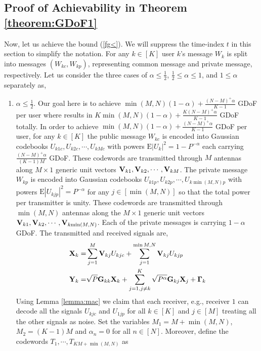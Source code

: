 \documentclass[11pt]{article}
\begin{document}
\subsection{Proof of Achievability in Theorem \ref{theorem:GDoF1}} \label{app3}
Now, let us achieve the bound (\ref{fg<}). We will suppress the time-index $t$ in this section to simplify the notation. For any $k\in[K]$ user $k$'s message $W_k$ is split into messages $(W_{kc},W_{kp})$, representing common message and private message, respectively.  Let us consider the three cases of $\alpha\le\frac{1}{2}$, $\frac{1}{2}\le\alpha\le1$, and $1\le\alpha$ separately as,
\begin{enumerate}
\item {$\alpha\le\frac{1}{2}$.} Our goal here is to achieve $\min(M,N)(1-\alpha)+\frac{(N-M)^+\alpha}{K-1}$ GDoF per user where results in $K\min(M,N)(1-\alpha)+\frac{K(N-M)^+\alpha}{K-1}$ GDoF totally. In order to achieve $\min(M,N)(1-\alpha)+\frac{(N-M)^+\alpha}{K-1}$ GDoF per user, for any $k\in[K]$ the public message $W_{kc}$ is encoded into Gaussian codebooks $U_{k1c},U_{k2c},\cdots,U_{kMc}$ with powers $\mbox{E}{|U_k|}^2=1-P^{-\alpha}$ each carrying $\frac{(N-M)^+\alpha}{(K-1)M}$ GDoF. These codewords are transmitted through $M$ antennas along  $M\times 1$ generic unit  vectors ${\bf V}_{k1},{\bf V}_{k2},\cdots,{\bf V}_{k{M}}$.  The private message $W_{kp}$ is encoded into Gaussian codebooks $U_{k1p},U_{k2p},\cdots,U_{k\min(M,N)p}$ with powers $\mbox{E}{|U_{kjp}|}^2=P^{-\alpha}$ for any $j\in[\min(M,N)]$ so that the total power per transmitter is unity. These codewords are transmitted through $\min(M,N)$ antennas along the $M\times 1$ generic unit  vectors ${\bf V}_{k1},{\bf V}_{k2},\cdots,{\bf V}_{k{\min(M,N)}}$. Each of the  private messages is carrying $1-\alpha$ GDoF. The transmitted and received signals are,
\begin{align}
\mathbf{X}_{k}=&\sum_{j=1}^{M}\mathbf{V}_{kj}{U}_{kjc}+\sum_{j=1}^{\min{M,N}}\mathbf{V}_{kj}{U}_{kjp}\label{TR21a-}\\
\mathbf{Y}_{k}=&\sqrt{P}{\bf G}_{kk}\mathbf{X}_{k}+\sum_{j=1,j\neq k}^{K}\sqrt{P^{\alpha}}{\bf {G}}_{kj}\mathbf{X}_{j}+\mathbf{\Gamma}_{k}\label{TR21a}
\end{align}
 Using Lemma \ref{lemma:mac} we claim that each receiver, e.g., receiver $1$ can decode  all the signals $U_{kjc}$ and $U_{1jp}$ for all $k\in[K]$ and $j\in[M]$  treating all the other signals as noise. Set the variables $M_1=M+\min(M,N)$, $M_2=(K-1)M$ and $\alpha_n=0$ for all $n\in[N]$. Moreover, define the codewords $T_{1},\cdots,T_{KM+\min(M,N)}$ as 

\end{enumerate}
\end{document}
